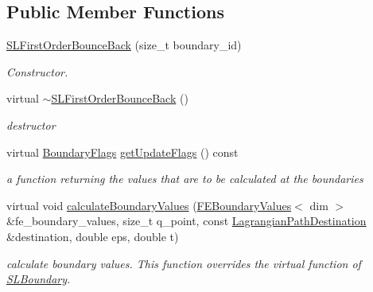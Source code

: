 \subsection*{Public Member Functions}
\begin{DoxyCompactItemize}
\item 
\hypertarget{classnatrium_1_1SLFirstOrderBounceBack_ad387719d716c6c4ef323d082e9abe90f}{
\hyperlink{classnatrium_1_1SLFirstOrderBounceBack_ad387719d716c6c4ef323d082e9abe90f}{SLFirstOrderBounceBack} (size\_\-t boundary\_\-id)}
\label{classnatrium_1_1SLFirstOrderBounceBack_ad387719d716c6c4ef323d082e9abe90f}

\begin{DoxyCompactList}\small\item\em Constructor. \item\end{DoxyCompactList}\item 
\hypertarget{classnatrium_1_1SLFirstOrderBounceBack_a9f7143924cb11361e0dc68d9d2accaca}{
virtual \hyperlink{classnatrium_1_1SLFirstOrderBounceBack_a9f7143924cb11361e0dc68d9d2accaca}{$\sim$SLFirstOrderBounceBack} ()}
\label{classnatrium_1_1SLFirstOrderBounceBack_a9f7143924cb11361e0dc68d9d2accaca}

\begin{DoxyCompactList}\small\item\em destructor \item\end{DoxyCompactList}\item 
\hypertarget{classnatrium_1_1SLFirstOrderBounceBack_ab64572ca24635330d2831d11bb4796db}{
virtual \hyperlink{namespacenatrium_a93b2a3d564675413b9f6cc88c60f46af}{BoundaryFlags} \hyperlink{classnatrium_1_1SLFirstOrderBounceBack_ab64572ca24635330d2831d11bb4796db}{getUpdateFlags} () const }
\label{classnatrium_1_1SLFirstOrderBounceBack_ab64572ca24635330d2831d11bb4796db}

\begin{DoxyCompactList}\small\item\em a function returning the values that are to be calculated at the boundaries \item\end{DoxyCompactList}\item 
virtual void \hyperlink{classnatrium_1_1SLFirstOrderBounceBack_a0ff05e7fd8cd657f77fd9636c7a55e60}{calculateBoundaryValues} (\hyperlink{classnatrium_1_1FEBoundaryValues}{FEBoundaryValues}$<$ dim $>$ \&fe\_\-boundary\_\-values, size\_\-t q\_\-point, const \hyperlink{structnatrium_1_1LagrangianPathDestination}{LagrangianPathDestination} \&destination, double eps, double t)
\begin{DoxyCompactList}\small\item\em calculate boundary values. This function overrides the virtual function of \hyperlink{classnatrium_1_1SLBoundary}{SLBoundary}. \item\end{DoxyCompactList}\end{DoxyCompactItemize}


